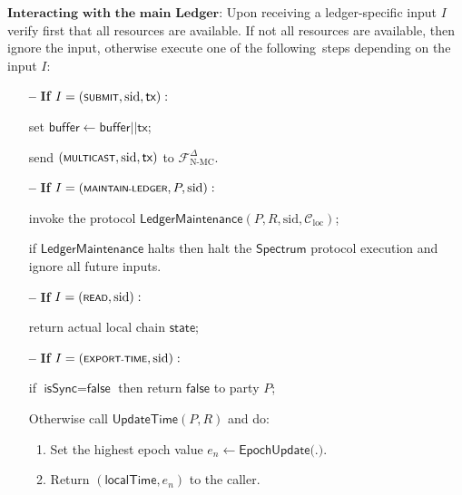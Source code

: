 \begin{protocol}
\begin{algorithmic}
        \State $\textbf{Interacting with the main Ledger:}$
        Upon receiving a ledger-specific input $I$ verify first that all resources are available.
        If not all resources are available, then ignore the input, otherwise execute one of the following\
        steps depending on the input $I$:
        \begin{itemize}
            \item[\textbf{--}] \textbf{If} $I = (\textsf{\scriptsize{SUBMIT}}, \text{sid}, \textsf{tx}):$
            \item[] set $\textsf{buffer} \leftarrow \textsf{buffer} || \textsf{tx}$;
            \item [] send $(\textsf{\scriptsize{MULTICAST}}, \text{sid}, \textsf{tx})$ to $\mathcal{F}^{\Delta}_{\text{N-MC}}$.
            \item[\textbf{--}] \textbf{If} $I = (\textsf{\scriptsize{MAINTAIN-LEDGER}}, P, \text{sid}):$
            \item[] invoke the protocol \hyperref[apndx:main-ledger-protocol]{$\textsf{LedgerMaintenance}$}$(P, R, \text{sid}, \mathcal{C}_{\text{loc}})$;
            \item[] if $\textsf{LedgerMaintenance}$ halts then halt the $\textsf{Spectrum}$ protocol execution and ignore all future inputs.
            \item[\textbf{--}] \textbf{If} $I = (\textsf{\scriptsize{READ}}, \text{sid}):$
            \item[] return actual local chain $\textsf{state}$;
            \item[\textbf{--}] \textbf{If} $I = (\textsf{\scriptsize{EXPORT-TIME}}, \text{sid}):$
            \item[] if $\textsf{isSync} = \textsf{false}$ then return $\textsf{false}$ to party $P$;
            \item[] Otherwise call \hyperref[apndx:update-time-protocol]{$\textsf{UpdateTime}$}$(P, R)$ and do:
            \begin{enumerate}
                \item Set the highest epoch value $e_n \leftarrow \textsf{EpochUpdate(.)}$.
                \item Return $(\textsf{localTime}, e_n)$ to the caller.
            \end{enumerate}
        \end{itemize}


\end{algorithmic}
\end{protocol}
